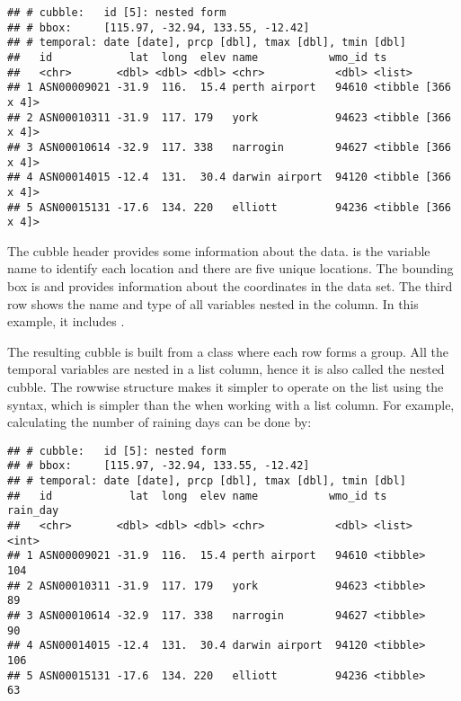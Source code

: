 \documentclass{article}
\newenvironment{Shaded}{\begin{snugshade}}{\end{snugshade}}
\newcommand{\AttributeTok}[1]{\textcolor[rgb]{0.77,0.63,0.00}{#1}}
\newcommand{\DecValTok}[1]{\textcolor[rgb]{0.00,0.00,0.81}{#1}}
\newcommand{\ErrorTok}[1]{\textcolor[rgb]{0.64,0.00,0.00}{\textbf{#1}}}
\newcommand{\FunctionTok}[1]{\textcolor[rgb]{0.00,0.00,0.00}{#1}}
\newcommand{\NormalTok}[1]{#1}
\newcommand{\SpecialCharTok}[1]{\textcolor[rgb]{0.00,0.00,0.00}{#1}}
\begin{document}
\begin{verbatim}
## # cubble:   id [5]: nested form
## # bbox:     [115.97, -32.94, 133.55, -12.42]
## # temporal: date [date], prcp [dbl], tmax [dbl], tmin [dbl]
##   id            lat  long  elev name           wmo_id ts                
##   <chr>       <dbl> <dbl> <dbl> <chr>           <dbl> <list>            
## 1 ASN00009021 -31.9  116.  15.4 perth airport   94610 <tibble [366 x 4]>
## 2 ASN00010311 -31.9  117. 179   york            94623 <tibble [366 x 4]>
## 3 ASN00010614 -32.9  117. 338   narrogin        94627 <tibble [366 x 4]>
## 4 ASN00014015 -12.4  131.  30.4 darwin airport  94120 <tibble [366 x 4]>
## 5 ASN00015131 -17.6  134. 220   elliott         94236 <tibble [366 x 4]>
\end{verbatim}

The cubble header provides some information about the data.  is the variable name to identify each location and there are five unique locations. The bounding box is \code{[115.97, -32.94, 133.55, -12.42]} and provides information about the coordinates in the data set. The third row shows the name and type of all variables nested in the  column. In this example, it includes .

The resulting cubble is built from a  class where each row forms a group. All the temporal variables are nested in a list column, hence it is also called the nested cubble. The rowwise structure makes it simpler to operate on the list using the  syntax, which is simpler than the  when working with a list column. For example, calculating the number of raining days can be done by:

\begin{Shaded}
\end{Shaded}

\begin{verbatim}
## # cubble:   id [5]: nested form
## # bbox:     [115.97, -32.94, 133.55, -12.42]
## # temporal: date [date], prcp [dbl], tmax [dbl], tmin [dbl]
##   id            lat  long  elev name           wmo_id ts       rain_day
##   <chr>       <dbl> <dbl> <dbl> <chr>           <dbl> <list>      <int>
## 1 ASN00009021 -31.9  116.  15.4 perth airport   94610 <tibble>      104
## 2 ASN00010311 -31.9  117. 179   york            94623 <tibble>       89
## 3 ASN00010614 -32.9  117. 338   narrogin        94627 <tibble>       90
## 4 ASN00014015 -12.4  131.  30.4 darwin airport  94120 <tibble>      106
## 5 ASN00015131 -17.6  134. 220   elliott         94236 <tibble>       63
\end{verbatim}
\end{document}
